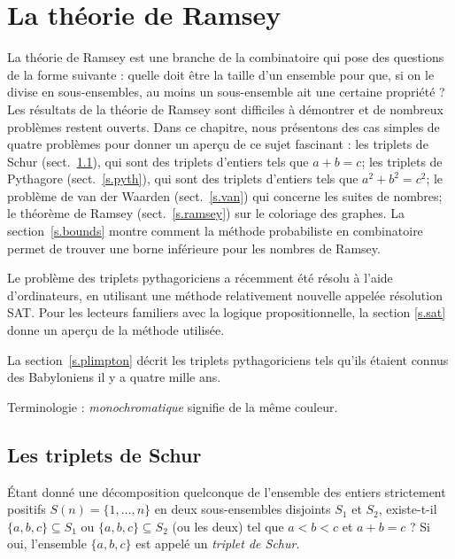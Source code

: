 \chapter{La théorie de Ramsey}\label{c.ramsey}




La théorie de Ramsey est une branche de la combinatoire qui pose des questions de la forme suivante : quelle doit être la taille d'un ensemble pour que, si on le divise en sous-ensembles, au moins un sous-ensemble ait une certaine propriété ?
Les résultats de la théorie de Ramsey sont difficiles à démontrer et de nombreux problèmes restent ouverts. Dans ce chapitre, nous présentons des cas simples de quatre problèmes pour donner un aperçu de ce sujet fascinant : les triplets de Schur (sect.~\ref{s.schur}), qui sont des triplets d'entiers tels que $a+b=c$; les triplets de Pythagore (sect.~\ref{s.pyth}), qui sont des triplets d'entiers tels que $a^2+b^2=c^2$; le problème de van der Waarden (sect.~\ref{s.van}) qui concerne les suites de nombres; le théorème de Ramsey (sect.~\ref{s.ramsey}) sur le coloriage des graphes. La section~\ref{s.bounds} montre comment la méthode probabiliste en combinatoire permet de trouver une borne inférieure pour les nombres de Ramsey.

Le problème des triplets pythagoriciens a récemment été résolu à l'aide d'ordinateurs, en utilisant une méthode relativement nouvelle appelée résolution SAT. Pour les lecteurs familiers avec la logique propositionnelle, la section \ref{s.sat} donne un aperçu de la méthode utilisée.

La section~\ref{s.plimpton} décrit les triplets pythagoriciens tels qu'ils étaient connus des Babyloniens il y a quatre mille ans.

Terminologie : \emph{monochromatique} signifie de la même couleur.



\section{Les triplets de Schur}\label{s.schur}


\begin{definition}
Étant donné une décomposition quelconque de l'ensemble des entiers strictement positifs  
$S(n)=\{1,\ldots,n\}$ 
en deux sous-ensembles disjoints $S_1$ et $S_2$, existe-t-il $\{a,b,c\}\subseteq  S_1$ ou $\{a,b,c\}\subseteq S_2$ (ou les deux) tel que $a\!<\!b\!<\!c$ et $a+b=c$ ? Si oui, l'ensemble $\{a,b,c\}$ est appelé un \emph{triplet de Schur}.
\end{definition}

